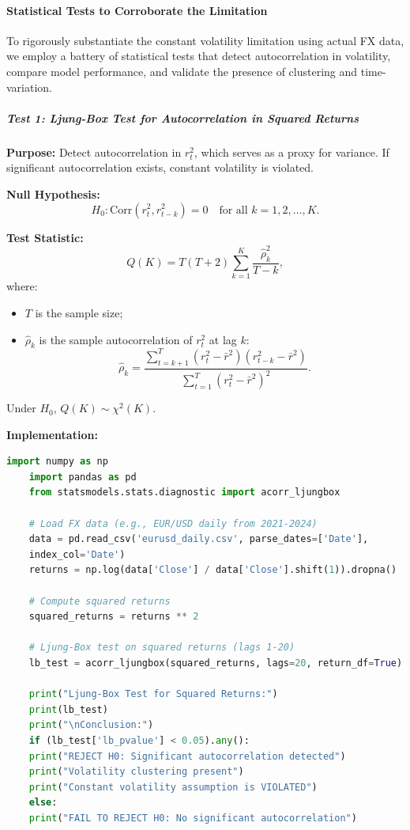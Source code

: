 \paragraph{Statistical Tests to Corroborate the Limitation}

To rigorously substantiate the constant volatility limitation using actual FX data, we employ a battery of statistical tests that detect autocorrelation in volatility, compare model performance, and validate the presence of clustering and time-variation.

\subparagraph{Test 1: Ljung-Box Test for Autocorrelation in Squared Returns}

\textbf{Purpose:} Detect autocorrelation in $r_t^2$, which serves as a proxy for variance. If significant autocorrelation exists, constant volatility is violated.

\textbf{Null Hypothesis:}
\begin{equation}
	H_0: \text{Corr}(r_t^2, r_{t-k}^2) = 0 \quad \text{for all } k = 1, 2, \ldots, K.
\end{equation}

\textbf{Test Statistic:}
\begin{equation}
	Q(K) = T(T+2) \sum_{k=1}^K \frac{\hat{\rho}_k^2}{T-k},
\end{equation}
where:
\begin{itemize}
	\item $T$ is the sample size;
	\item $\hat{\rho}_k$ is the sample autocorrelation of $r_t^2$ at lag $k$:
	\begin{equation}
		\hat{\rho}_k = \frac{\sum_{t=k+1}^T (r_t^2 - \bar{r}^2)(r_{t-k}^2 - \bar{r}^2)}{\sum_{t=1}^T (r_t^2 - \bar{r}^2)^2}.
	\end{equation}
\end{itemize}

Under $H_0$, $Q(K) \sim \chi^2(K)$.

\textbf{Implementation:}

\begin{lstlisting}[language=Python, caption={Ljung-Box Test for Squared Returns}]
	import numpy as np
	import pandas as pd
	from statsmodels.stats.diagnostic import acorr_ljungbox
	
	# Load FX data (e.g., EUR/USD daily from 2021-2024)
	data = pd.read_csv('eurusd_daily.csv', parse_dates=['Date'], 
	index_col='Date')
	returns = np.log(data['Close'] / data['Close'].shift(1)).dropna()
	
	# Compute squared returns
	squared_returns = returns ** 2
	
	# Ljung-Box test on squared returns (lags 1-20)
	lb_test = acorr_ljungbox(squared_returns, lags=20, return_df=True)
	
	print("Ljung-Box Test for Squared Returns:")
	print(lb_test)
	print("\nConclusion:")
	if (lb_test['lb_pvalue'] < 0.05).any():
	print("REJECT H0: Significant autocorrelation detected")
	print("Volatility clustering present")
	print("Constant volatility assumption is VIOLATED")
	else:
	print("FAIL TO REJECT H0: No significant autocorrelation")
\end{lstlisting}

